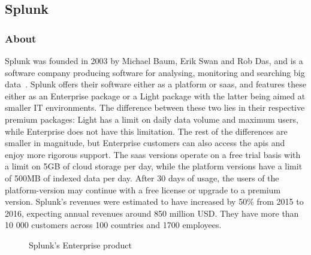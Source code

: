 \subsection{Splunk}
\subsubsection{About}
Splunk was founded in 2003 by Michael Baum, Erik Swan and Rob Das, and is a software company producing software for analysing, monitoring and searching big data~\cite{derrickharris2010}. Splunk offers their software either as a platform or \gls{saas}, and features these either as an Enterprise package or a Light package with the latter being aimed at smaller IT environments. The difference between these two lies in their respective premium packages: Light has a limit on daily data volume and maximum users, while Enterprise does not have this limitation. The rest of the differences are smaller in magnitude, but Enterprise customers can also access the \glspl{api} and enjoy more rigorous support. The \gls{saas} versions operate on a free trial basis with a limit on 5GB of cloud storage per day, while the platform versions have a limit of 500MB of indexed data per day. After 30 days of usage, the users of the platform-version may continue with a free license or upgrade to a premium version. Splunk's revenues were estimated to have increased by 50\% from 2015 to 2016, expecting annual revenues around 850 million USD. They have more than 10 000 customers across 100 countries and 1700 employees.

\begin{figure}[H]
    \centering
    \caption{Splunk's Enterprise product~\cite{splunkinc20162}}
    \label{fig:splunk}
\end{figure}

